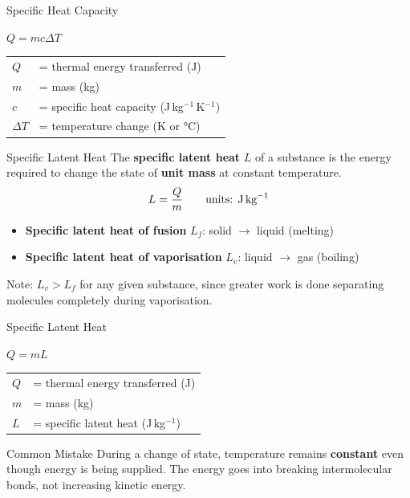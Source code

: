 \begin{formulabox}{Specific Heat Capacity}
\begin{center}
\Large $Q = mc\Delta T$
\end{center}
\vspace{0.3em}
\begin{tabular}{@{}ll@{}}
$Q$ & = thermal energy transferred (J) \\
$m$ & = mass (kg) \\
$c$ & = specific heat capacity (J\,kg$^{-1}$\,K$^{-1}$) \\
$\Delta T$ & = temperature change (K or °C) \\
\end{tabular}
\end{formulabox}

\begin{definitionbox}{Specific Latent Heat}
The \textbf{specific latent heat} $L$ of a substance is the energy required to change the state of \textbf{unit mass} at constant temperature.
$$L = \frac{Q}{m} \qquad \text{units: J\,kg}^{-1}$$

\begin{itemize}[itemsep=2pt]
  \item \textbf{Specific latent heat of fusion} $L_f$: solid $\rightarrow$ liquid (melting)
  \item \textbf{Specific latent heat of vaporisation} $L_v$: liquid $\rightarrow$ gas (boiling)
\end{itemize}
Note: $L_v > L_f$ for any given substance, since greater work is done separating molecules completely during vaporisation.
\end{definitionbox}

\begin{formulabox}{Specific Latent Heat}
\begin{center}
\Large $Q = mL$
\end{center}
\vspace{0.3em}
\begin{tabular}{@{}ll@{}}
$Q$ & = thermal energy transferred (J) \\
$m$ & = mass (kg) \\
$L$ & = specific latent heat (J\,kg$^{-1}$) \\
\end{tabular}
\end{formulabox}

\begin{warningbox}{Common Mistake}
During a change of state, temperature remains \textbf{constant} even though energy is being supplied. The energy goes into breaking intermolecular bonds, not increasing kinetic energy.
\end{warningbox}

